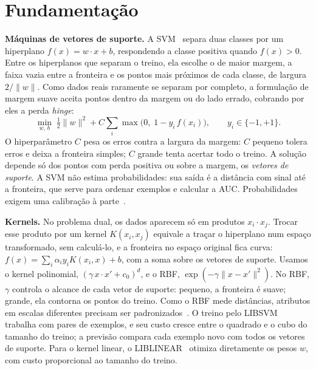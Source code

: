 \section{Fundamentação}

\textbf{Máquinas de vetores de suporte.} A SVM~\cite{boser:92,cortes:95} separa duas classes por um hiperplano $f(x) = w \cdot x + b$, respondendo a classe positiva quando $f(x) > 0$. Entre os hiperplanos que separam o treino, ela escolhe o de maior margem, a faixa vazia entre a fronteira e os pontos mais próximos de cada classe, de largura $2/\lVert w \rVert$. Como dados reais raramente se separam por completo, a formulação de margem suave aceita pontos dentro da margem ou do lado errado, cobrando por eles a perda \emph{hinge}:
\begin{equation*}
  \min_{w,\,b} \; \tfrac{1}{2}\lVert w \rVert^2 + C \sum_i \max\bigl(0,\; 1 - y_i\, f(x_i)\bigr), \qquad y_i \in \{-1, +1\}.
\end{equation*}
O hiperparâmetro $C$ pesa os erros contra a largura da margem: $C$ pequeno tolera erros e deixa a fronteira simples; $C$ grande tenta acertar todo o treino. A solução depende só dos pontos com perda positiva ou sobre a margem, os \emph{vetores de suporte}. A SVM não estima probabilidades: sua saída é a distância com sinal até a fronteira, que serve para ordenar exemplos e calcular a AUC. Probabilidades exigem uma calibração à parte~\cite{platt:99}.

\textbf{Kernels.} No problema dual, os dados aparecem só em produtos $x_i \cdot x_j$. Trocar esse produto por um kernel $K(x_i, x_j)$ equivale a traçar o hiperplano num espaço transformado, sem calculá-lo, e a fronteira no espaço original fica curva: $f(x) = \sum_i \alpha_i y_i K(x_i, x) + b$, com a soma sobre os vetores de suporte. Usamos o kernel polinomial, $(\gamma\, x \cdot x' + c_0)^d$, e o RBF, $\exp(-\gamma \lVert x - x' \rVert^2)$. No RBF, $\gamma$ controla o alcance de cada vetor de suporte: pequeno, a fronteira é suave; grande, ela contorna os pontos do treino. Como o RBF mede distâncias, atributos em escalas diferentes precisam ser padronizados~\cite{hsu:03}. O treino pelo LIBSVM~\cite{chang:11} trabalha com pares de exemplos, e seu custo cresce entre o quadrado e o cubo do tamanho do treino; a previsão compara cada exemplo novo com todos os vetores de suporte. Para o kernel linear, o LIBLINEAR~\cite{fan:08} otimiza diretamente os pesos $w$, com custo proporcional ao tamanho do treino.

